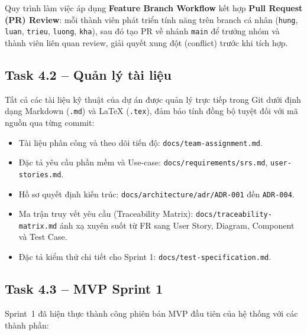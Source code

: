 \documentclass[a4paper]{article}
\begin{document}
Quy trình làm việc áp dụng \textbf{Feature Branch Workflow} kết hợp \textbf{Pull Request (PR) Review}: mỗi thành viên phát triển tính năng trên branch cá nhân (\texttt{hung}, \texttt{luan}, \texttt{trieu}, \texttt{luong}, \texttt{kha}), sau đó tạo PR về nhánh \texttt{main} để trưởng nhóm và thành viên liên quan review, giải quyết xung đột (conflict) trước khi tích hợp.

\subsection{Task 4.2 – Quản lý tài liệu}

Tất cả các tài liệu kỹ thuật của dự án được quản lý trực tiếp trong Git dưới định dạng Markdown (\texttt{.md}) và LaTeX (\texttt{.tex}), đảm bảo tính đồng bộ tuyệt đối với mã nguồn qua từng commit:

\begin{itemize}
    \item Tài liệu phân công và theo dõi tiến độ: \texttt{docs/team-assignment.md}.
    \item Đặc tả yêu cầu phần mềm và Use-case: \texttt{docs/requirements/srs.md}, \texttt{user-stories.md}.
    \item Hồ sơ quyết định kiến trúc: \texttt{docs/architecture/adr/ADR-001} đến \texttt{ADR-004}.
    \item Ma trận truy vết yêu cầu (Traceability Matrix): \texttt{docs/traceability-matrix.md} ánh xạ xuyên suốt từ FR sang User Story, Diagram, Component và Test Case.
    \item Đặc tả kiểm thử chi tiết cho Sprint 1: \texttt{docs/test-specification.md}.
\end{itemize}

\subsection{Task 4.3 – MVP Sprint 1}

Sprint~1 đã hiện thực thành công phiên bản MVP đầu tiên của hệ thống với các thành phần:
\end{document}
